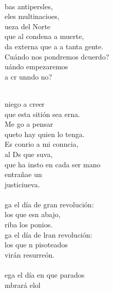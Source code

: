 \begin{cancion}
	\jump\\
	bas antipersles,\\
	eles multinacioes,\\
	ueza del Norte\\
	que al  condena a muerte,\\
	da externa que a a tanta gente.\\
	Cuándo nos pondremos dcuerdo?\\
	uándo empezaremos\\
	a cr unndo no?  \\\jump\\
	\begin{chorus}%
	 niego a creer\\
	que esta sitión sea erna.\\
	Me go a pensar \\
	queto hay quien lo tenga.\\
	Es conrio a mi conncia,\\
	al Ds que suva,\\
	que ha insto en cada ser mano\\
	entrañae un\\
	justiciueva.   \\
\jump\\
	ga el día de gran revolución:\\
	los que esn abajo,  \\
	riba los ponios.\\
	ga el día de lran revolución:\\
	los que n pisoteados \\
	virán resurreón.\\
\jump\\
	ega el día en que parados\\
	mbrará elol\\
	\end{chorus}%
	\jump\\
\end{cancion}%
